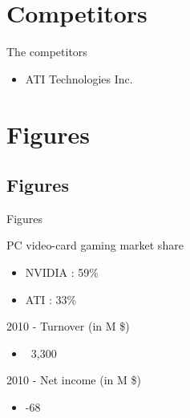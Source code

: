 \documentclass{beamer}
\begin{document}
\section{Competitors}
\begin{frame}{The competitors}
	\transdissolve[duration=0.1]
	\begin{block}{}
		\begin{itemize}
			\item<+->{ATI Technologies Inc.}
		\end{itemize}
	\end{block}
\end{frame}

\section{Figures}
\subsection{Figures}
\begin{frame}{Figures}
	\transdissolve[duration=0.1] %
	\begin{block}{PC video-card gaming market share}
		\begin{itemize}
			\item<+->{NVIDIA : 59\% }
			\item<+->{ATI : 33\% }
		\end{itemize}
	\end{block}	
	\begin{block}{2010 - Turnover (in M \$)}
		\begin{itemize}
			\item<+->{~3,300}
		\end{itemize}
	\end{block}
	\begin{block}{2010 - Net income (in M \$)}
		\begin{itemize}
			\item<+->{-68}
		\end{itemize}
	\end{block}
\end{frame}
\end{document}
